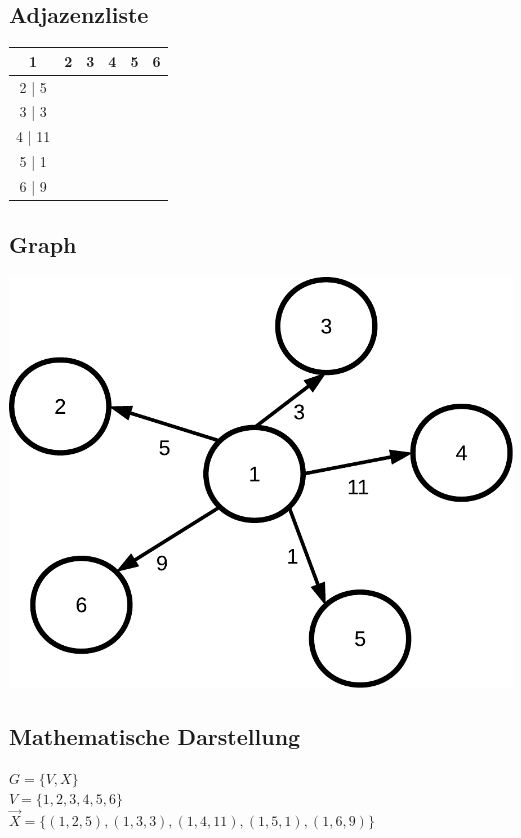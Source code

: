 \documentclass[a4paper, 11pt]{article}
\begin{document}
\subsection*{Adjazenzliste}
\begin{tabular}{ |c|c|c|c|c|c| }
\hline
\textbf{1} & \textbf{2} & \textbf{3} & \textbf{4} & \textbf{5} & \textbf{6} \\
\hline
\hline
2 | 5 & & & & & \\
\hline
3 | 3 & & & & & \\
\hline
4 | 11 & & & & & \\
\hline
5 | 1 & & & & & \\
\hline
6 | 9 & & & & & \\
\hline
\end{tabular}

\subsection*{Graph}
\includegraphics[width=0.5\linewidth]{img/pdf/Aufgabe_3-4}

\subsection*{Mathematische Darstellung}
\( G = \{ V , X \} \) \\
\( V = \{ 1 , 2 , 3 , 4 , 5 , 6 \} \)  \\
\( \vec X = \{ (1,2,5) , (1,3,3) , (1,4,11) , (1,5,1) , (1,6,9) \} \)





\end{document}
